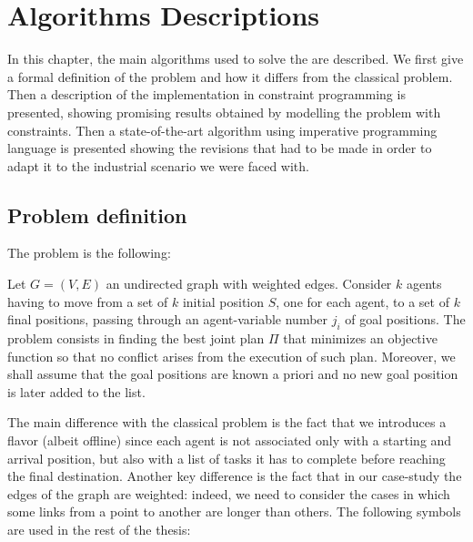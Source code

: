 \chapter{Algorithms Descriptions}
\label{ch:solutions}
In this chapter, the main algorithms used to solve the  are
described. We first give a formal definition of the problem and how it
differs from the classical  problem. Then a description of the
implementation in constraint programming is presented, showing promising
results obtained by modelling the problem with constraints. \newline
Then a state-of-the-art algorithm using imperative programming language is
presented showing the revisions that had to be made in order to adapt it to the
industrial scenario we were faced with.
%
%
%
\section{Problem definition}
The problem is the following:
\begin{definition}
  Let $G=(V,E)$ an undirected graph with weighted edges. Consider $k$ agents
  having to move from a set of $k$ initial position $S$, one for each agent, to
  a set of $k$ final positions, passing through an agent-variable number $j_i$
  of goal positions. The problem consists in finding the best joint plan $\Pi$
  that minimizes an objective function so that no conflict arises from the
  execution of such plan. \newline
  Moreover, we shall assume that the goal positions are known a priori and no
  new goal position is later added to the list.
\end{definition}
The main difference with the classical  problem is the fact that
we introduces a  flavor (albeit offline) since each agent is not
associated only with a starting and arrival position, but also with a list of
tasks it has to complete before reaching the final destination. \newline
Another key difference is the fact that in our case-study the edges of the 
graph are weighted: indeed, we need to consider the cases in which some links 
from a point to another are longer than others. \newline
The following symbols are used in the rest of the thesis:
